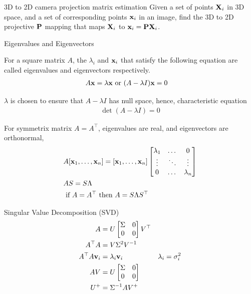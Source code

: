 \documentclass[times,t]{beamer}
\begin{document}
\begin{frame}{3D  to  2D camera projection matrix estimation}
  Given a set of points $\mathbf{X}_i$ in 3D space, and a set
  of corresponding points $\mathbf{x}_i$ in an image, find the 3D to 2D projective
  $\mathbf{P}$ mapping
  that maps $\mathbf{X}_i$ to $\mathbf{x}_i  =  \mathbf{P}\mathbf{X}_i$.
  \end{frame}

\begin{frame}{Eigenvalues  and Eigenvectors}

For a  square  matrix $A$, the $\lambda_i$ and  $\mathbf{x}_i$ that satisfy  the
following equation are called eigenvalues and  eigenvectors  respectively.
\begin{align}
  A  \mathbf{x} &= \lambda \mathbf{x} \text{ or } (A  - \lambda I)\mathbf{x}  = 0
\end{align}

$\lambda$ is   chosen to ensure  that   $A  -  \lambda I$  has null space,
hence, characteristic   equation
\begin{align}
  \det(A  - \lambda I) = 0 
 \end{align}

 For  symmetrix matrix $A =  A^\top$, eigenvalues  are  real, and eigenvectors
 are orthonormal,
 \begin{align}
   &A[\mathbf{x}_1, \dots,   \mathbf{x}_n]  = [\mathbf{x}_1, \dots,   \mathbf{x}_n]\begin{bmatrix}\lambda_1 &   \dots   &  0 \\
     \vdots   &   \ddots &  \vdots \\
   0 &   \dots  &  \lambda_n \end{bmatrix}
                  \\
   &A  S = S  \Lambda
   \\
   &\text{  if   }  A =  A^\top \text{ then   }  A   = S \Lambda S^\top
   \end{align}


\end{frame}

\begin{frame}{Singular Value  Decomposition (SVD)}
  \begin{align}
    A  &=   U  \begin{bmatrix}\Sigma   &  0  \\   0  &  0 \end{bmatrix} V^\top \\
    A^\top A &= V \Sigma^2  V^{-1} \\
    A^\top A \mathbf{v}_i  &= \lambda_i \mathbf{v}_i & \lambda_i = \sigma_i^2\\
    A V   &= U \begin{bmatrix}\Sigma   &  0  \\   0  &  0 \end{bmatrix}\\
    U^+   &=  \Sigma^{-1}AV^+
    \end{align}
\end{frame}
\end{document}
